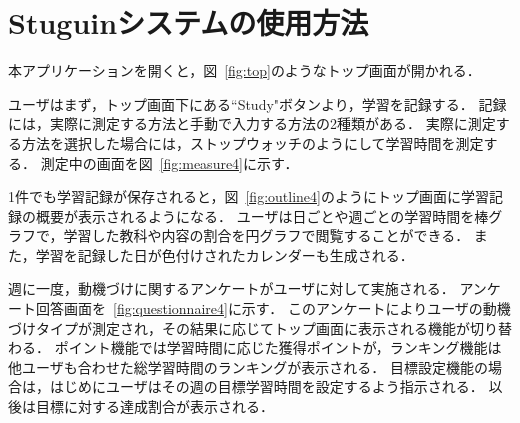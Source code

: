 \section{Stuguinシステムの使用方法}
本アプリケーションを開くと，図~\ref{fig:top}のようなトップ画面が開かれる．

ユーザはまず，トップ画面下にある``Study"ボタンより，学習を記録する．
記録には，実際に測定する方法と手動で入力する方法の2種類がある．
実際に測定する方法を選択した場合には，ストップウォッチのようにして学習時間を測定する．
測定中の画面を図~\ref{fig:measure4}に示す．

1件でも学習記録が保存されると，図~\ref{fig:outline4}のようにトップ画面に学習記録の概要が表示されるようになる．
ユーザは日ごとや週ごとの学習時間を棒グラフで，学習した教科や内容の割合を円グラフで閲覧することができる．
また，学習を記録した日が色付けされたカレンダーも生成される．

週に一度，動機づけに関するアンケートがユーザに対して実施される．
アンケート回答画面を~\ref{fig:questionnaire4}に示す．
このアンケートによりユーザの動機づけタイプが測定され，その結果に応じてトップ画面に表示される機能が切り替わる．
ポイント機能では学習時間に応じた獲得ポイントが，ランキング機能は他ユーザも合わせた総学習時間のランキングが表示される．
目標設定機能の場合は，はじめにユーザはその週の目標学習時間を設定するよう指示される．
以後は目標に対する達成割合が表示される．

